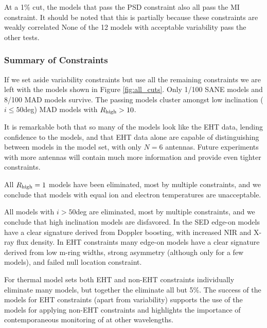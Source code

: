 At a 1\% cut, the models that pass the PSD constraint also all pass the MI constraint. It should be noted that this is partially because these constraints are weakly correlated  None of the 12 models with acceptable variability pass the other tests.


\subsubsection{Summary of Constraints}

If we set aside variability constraints but use all the remaining constraints we are left with the models shown in Figure \ref{fig:all_cuts}.  Only 1/100 SANE models and 8/100 MAD models survive. The passing models cluster amongst low inclination ($i \le 50$deg) MAD models with $R_\mathrm{high} > 10$.

It is remarkable both that so many of the models look like the EHT data, lending confidence to the models, and that EHT data alone are capable of distinguishing between models in the model set, with only $N = 6$ antennas.  Future experiments with more antennas will contain much more information and provide even tighter constraints.

All $R_\mathrm{high} = 1$ models have been eliminated, most by multiple constraints, and we conclude that models with equal ion and electron temperatures are unacceptable.

All models with $i > 50$deg are eliminated, most by multiple constraints, and we conclude that high inclination models are disfavored.  In the SED edge-on models have a clear signature derived from Doppler boosting, with increased NIR and X-ray flux density.  In EHT constraints many edge-on models have a clear signature derived from low m-ring widths, strong asymmetry (although only for a few models), and failed null location constraint.

For thermal model sets both EHT and non-EHT constraints individually eliminate many models, but together the eliminate all but 5\%.  The success of the models for EHT constraints (apart from variability) supports the use of the models for applying non-EHT constraints and highlights the importance of contemporaneous monitoring of \sgra at other wavelengths.

